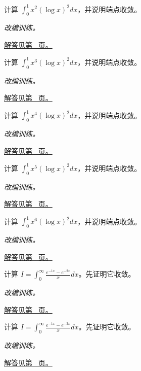 \documentclass[UTF8,12pt,a4paper,fontset=fandol]{ctexart}
\begin{document}
\begin{example}[对数权重的定积分]\label{ex:c20q8}
计算 $\displaystyle\int_0^1x^{2}(\log x)^2dx$，并说明端点收敛。
\par\textit{改编训练。}\par\hyperref[ans:c20q8]{解答见第~\pageref{ans:c20q8} 页。}
\end{example}
\begin{example}[对数权重的定积分]\label{ex:c20q9}
计算 $\displaystyle\int_0^1x^{3}(\log x)^2dx$，并说明端点收敛。
\par\textit{改编训练。}\par\hyperref[ans:c20q9]{解答见第~\pageref{ans:c20q9} 页。}
\end{example}
\begin{example}[对数权重的定积分]\label{ex:c20q10}
计算 $\displaystyle\int_0^1x^{4}(\log x)^2dx$，并说明端点收敛。
\par\textit{改编训练。}\par\hyperref[ans:c20q10]{解答见第~\pageref{ans:c20q10} 页。}
\end{example}
\begin{example}[对数权重的定积分]\label{ex:c20q11}
计算 $\displaystyle\int_0^1x^{5}(\log x)^2dx$，并说明端点收敛。
\par\textit{改编训练。}\par\hyperref[ans:c20q11]{解答见第~\pageref{ans:c20q11} 页。}
\end{example}
\begin{example}[对数权重的定积分]\label{ex:c20q12}
计算 $\displaystyle\int_0^1x^{6}(\log x)^2dx$，并说明端点收敛。
\par\textit{改编训练。}\par\hyperref[ans:c20q12]{解答见第~\pageref{ans:c20q12} 页。}
\end{example}
\begin{example}[两个衰减指数的消差]\label{ex:c20q13}
计算 $I=\displaystyle\int_0^\infty\frac{e^{-1x}-e^{-2x}}x dx$。先证明它收敛。
\par\textit{改编训练。}\par\hyperref[ans:c20q13]{解答见第~\pageref{ans:c20q13} 页。}
\end{example}
\begin{example}[两个衰减指数的消差]\label{ex:c20q14}
计算 $I=\displaystyle\int_0^\infty\frac{e^{-1x}-e^{-3x}}x dx$。先证明它收敛。
\par\textit{改编训练。}\par\hyperref[ans:c20q14]{解答见第~\pageref{ans:c20q14} 页。}
\end{example}
\end{document}
